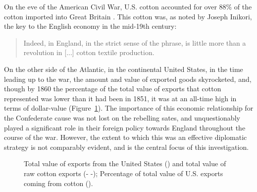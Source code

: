 
\Autocites(Data in Figure~\ref{fig: B.i}:)()[Total exports:][Part 2, Table 2]{u.s.congressImportsduties1884}[Cotton exports:][Table A-III]{northeconomicgrowth1966}
On the eve of the American Civil War, U.S. cotton accounted for over 88\% of the cotton imported into Great Britain \autocite[40]{baileyOtherSide1994}. This 
cotton was, as noted by Joseph Inikori, the key to the English economy in the mid-19th century: 
\begin{quote}
    Indeed,  in England, in the strict sense of the phrase, is little more than a revolution in [...] cotton textile production.
    \autocite[Joseph Inikori, {The Slave Trade and Revolution in Cotton Textile Production in England}, quoted in][40]{baileyOtherSide1994}
\end{quote}
On the other side of the Atlantic, in the continental United States, in the time leading up to the war, the amount and value of exported goods skyrocketed, 
and, though by 1860 the percentage of the total value of exports that cotton represented was lower than it had been in 1851, it was at an all-time high in 
terms of dollar-value (Figure~\ref{fig: B.i}). The importance of this economic relationship for the Confederate cause was not lost on the rebelling sates, 
and unquestionably played a significant role in their foreign policy towards England throughout the course of the war. However, the extent to which this was an 
effective diplomatic strategy is not comparably evident, and is the central focus of this investigation. 

\begin{figure}[ht]
    \centering
    
    \caption{
        Total value of exports from the United States (\textemdash) 
        and total value of raw cotton exports (- -);
        Percentage of total value of U.S. exports coming from cotton (\textcolor{red!75!black}{\textemdash}).
    }
    \label{fig: B.i}
\end{figure} 

